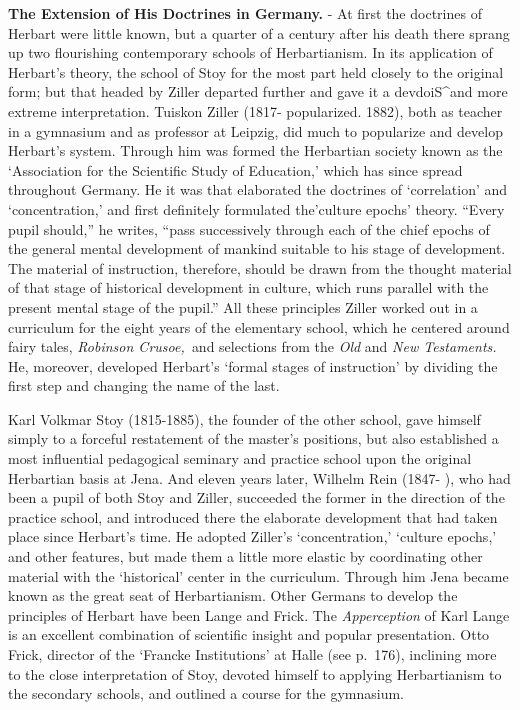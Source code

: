 \documentclass[
]{book}
\begin{document}
\textbf{The Extension of His Doctrines in Germany.} - At first the doctrines of Herbart were little known, but a quarter of a century after his death there sprang up two flourishing contemporary schools of Herbartianism. In its application of Herbart's theory, the school of Stoy for the most part held closely to the original form; but that headed by Ziller departed further and gave it a devdoiS\^{}and more extreme interpretation. Tuiskon Ziller (1817- popularized. 1882), both as teacher in a gymnasium and as professor at Leipzig, did much to popularize and develop Herbart's system. Through him was formed the Herbartian society known as the `Association for the Scientific Study of Education,' which has since spread throughout Germany. He it was that elaborated the doctrines of `correlation' and `concentration,' and first definitely formulated the'culture epochs' theory. ``Every pupil should,'' he writes, ``pass successively through each of the chief epochs of the general mental development of mankind suitable to his stage of development. The material of instruction, therefore, should be drawn from the thought material of that stage of historical development in culture, which runs parallel with the present mental stage of the pupil.'' All these principles Ziller worked out in a curriculum for the eight years of the elementary school, which he centered around fairy tales, \emph{Robinson Crusoe,~}and selections from the \emph{Old} and \emph{New Testaments.} He, moreover, developed Herbart's `formal stages of instruction' by dividing the first step and changing the name of the last.

Karl Volkmar Stoy (1815-1885), the founder of the other school, gave himself simply to a forceful restatement of the master's positions, but also established a most influential pedagogical seminary and practice school upon the original Herbartian basis at Jena. And eleven years later, Wilhelm Rein (1847- ), who had been a pupil of both Stoy and Ziller, succeeded the former in the direction of the practice school, and introduced there the elaborate development that had taken place since Herbart's time. He adopted Ziller's `concentration,' `culture epochs,' and other features, but made them a little more elastic by coordinating other material with the `historical' center in the curriculum. Through him Jena became known as the great seat of Herbartianism. Other Germans to develop the principles of Herbart have been Lange and Frick. The \emph{Apperception} of Karl Lange is an excellent combination of scientific insight and popular presentation. Otto Frick, director of the `Francke Institutions' at Halle (see p.~176), inclining more to the close interpretation of Stoy, devoted himself to applying Herbartianism to the secondary schools, and outlined a course for the gymnasium.
\end{document}
